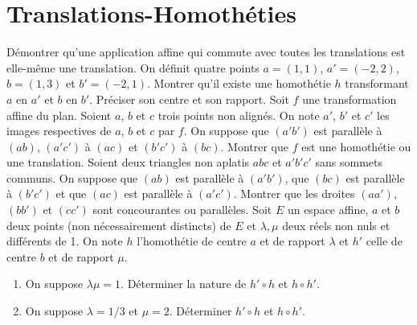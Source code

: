  \section{Translations-Homoth\'eties}
 \be
 D\'emontrer qu'une application affine qui commute avec toutes les translations est elle-même une translation.
 \ee
 \medskip
 \be
 On d\'efinit quatre points  $a=(1,1)$, $a'=(-2,2)$, $b=(1,3)$ et $b'=(-2,1)$. Montrer qu'il existe une homoth\'etie $h$ transformant $a$ en $a'$ et $b$ en $b'$. Pr\'eciser son centre et son rapport.
 \ee
\medskip
\be
Soit $f$ une transformation affine du plan. Soient $a$, $b$ et $c$ trois points non align\'es. 
On note $a'$, $b'$ et $c'$ les images respectives de $a$,
$b$ et $c$ par $f$. On suppose que $(a'b')$ est parall\`ele \`a
$(ab)$, $(a'c')$ \`a $(ac)$ et $(b'c')$ \`a $(bc)$. Montrer que $f$ est une
homoth\'etie ou une translation.
\ee
\medskip
Soient deux triangles non aplatis $abc$ et $a'b'c'$ sans sommets communs. 
On suppose
que $(ab)$ est parall\`ele \`a $(a'b')$, que $(bc)$ est parall\`ele \`a $(b'c')$ et
que $(ac)$ est parall\`ele \`a $(a'c')$. Montrer que les droites $(aa')$,
$(bb')$ et $(cc')$ sont concourantes ou parall\`eles.
\ee
\medskip
\be
Soit $E$ un espace affine, $a$ et $b$ deux points (non n\'ecessairement distincts) de $E$ et $\lambda, \mu$ deux r\'eels non nuls et diff\'erents de 1. On note $h$ l'homoth\'etie de centre $a$ et de rapport $\lambda$ et $h'$ celle de centre $b$ et de rapport $\mu$. 
\begin{enumerate}
\item On suppose $\lambda\mu=1$. D\'eterminer la nature de $h'\circ h$  et $h\circ h'$.
\item On suppose $\lambda=1/3$ et $\mu=2$. D\'eterminer  $h'\circ h$  et $h\circ h'$.
\end{enumerate}
